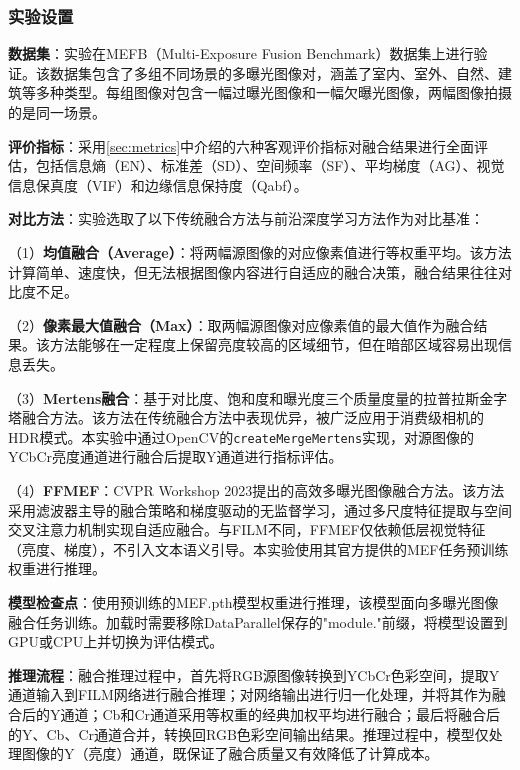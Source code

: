 \subsubsection{实验设置}\label{sec:experiment_setup}

\textbf{数据集}：实验在MEFB（Multi-Exposure Fusion Benchmark）数据集上进行验证。该数据集包含了多组不同场景的多曝光图像对，涵盖了室内、室外、自然、建筑等多种类型。每组图像对包含一幅过曝光图像和一幅欠曝光图像，两幅图像拍摄的是同一场景。

\textbf{评价指标}：采用\cref{sec:metrics}中介绍的六种客观评价指标对融合结果进行全面评估，包括信息熵（EN）、标准差（SD）、空间频率（SF）、平均梯度（AG）、视觉信息保真度（VIF）和边缘信息保持度（Qabf）。

\textbf{对比方法}：实验选取了以下传统融合方法与前沿深度学习方法作为对比基准：

（1）\textbf{均值融合（Average）}：将两幅源图像的对应像素值进行等权重平均。该方法计算简单、速度快，但无法根据图像内容进行自适应的融合决策，融合结果往往对比度不足。

（2）\textbf{像素最大值融合（Max）}：取两幅源图像对应像素值的最大值作为融合结果。该方法能够在一定程度上保留亮度较高的区域细节，但在暗部区域容易出现信息丢失。

（3）\textbf{Mertens融合}\supercite{mertens2009exposure}：基于对比度、饱和度和曝光度三个质量度量的拉普拉斯金字塔融合方法。该方法在传统融合方法中表现优异，被广泛应用于消费级相机的HDR模式。本实验中通过OpenCV的\texttt{createMergeMertens}实现，对源图像的YCbCr亮度通道进行融合后提取Y通道进行指标评估。

（4）\textbf{FFMEF}\supercite{zheng2023ffmef}：CVPR Workshop 2023提出的高效多曝光图像融合方法。该方法采用滤波器主导的融合策略和梯度驱动的无监督学习，通过多尺度特征提取与空间交叉注意力机制实现自适应融合。与FILM不同，FFMEF仅依赖低层视觉特征（亮度、梯度），不引入文本语义引导。本实验使用其官方提供的MEF任务预训练权重进行推理。

\textbf{模型检查点}：使用预训练的MEF.pth模型权重进行推理，该模型面向多曝光图像融合任务训练。加载时需要移除DataParallel保存的"module."前缀，将模型设置到GPU或CPU上并切换为评估模式。

\textbf{推理流程}：融合推理过程中，首先将RGB源图像转换到YCbCr色彩空间，提取Y通道输入到FILM网络进行融合推理；对网络输出进行归一化处理，并将其作为融合后的Y通道；Cb和Cr通道采用等权重的经典加权平均进行融合；最后将融合后的Y、Cb、Cr通道合并，转换回RGB色彩空间输出结果。推理过程中，模型仅处理图像的Y（亮度）通道，既保证了融合质量又有效降低了计算成本。

